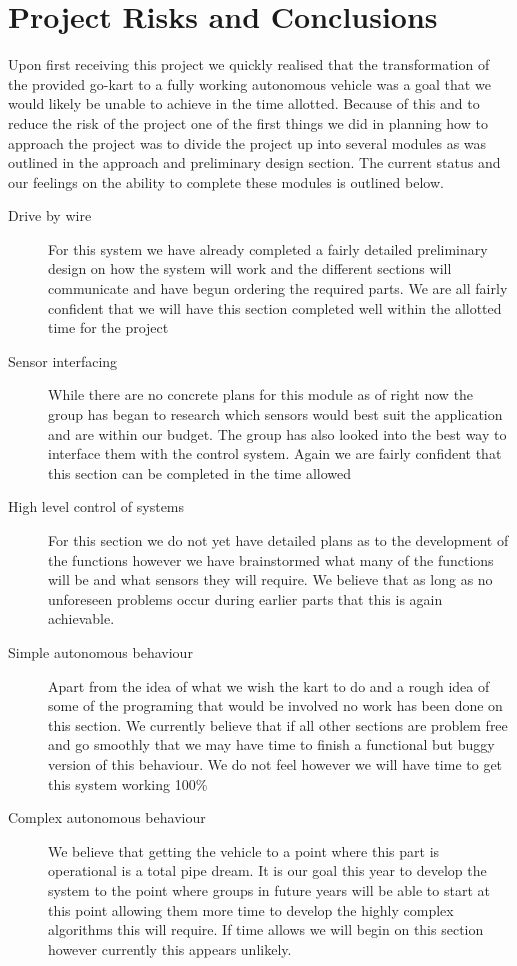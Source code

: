 \chapter{Project Risks and Conclusions}

Upon first receiving this project we quickly realised that the transformation of the provided go-kart to a fully working autonomous vehicle was a goal that we would likely be unable to achieve in the time allotted. Because of this and to reduce the risk of the project one of the first things we did in planning how to approach the project was to divide the project up into several modules as was outlined in the approach and preliminary design section. The current status and our feelings on the ability to complete these modules is outlined below.

\begin{description}
\item[Drive by wire] For this system we have already completed a fairly detailed preliminary design on how the system will work and the different sections will communicate and have begun ordering the required parts. We are all fairly confident that we will have this section completed well within the allotted time for the project

\item[Sensor interfacing] While there are no concrete plans for this module as of right now the group has began to research which sensors would best suit the application and are within our budget. The group has also looked into the best way to interface them with the control system. Again we are fairly confident that this section can be completed in the time allowed

\item[High level control of systems] For this section we do not yet have detailed plans as to the development of the functions however we have brainstormed what many of the functions will be and what sensors they will require. We believe that as long as no unforeseen problems occur during earlier parts that this is again achievable.

\item[Simple autonomous behaviour] Apart from the idea of what we wish the kart to do and a rough idea of some of the programing that would be involved no work has been done on this section. We currently believe that if all other sections are problem free and go smoothly that we may have time to finish a functional but buggy version of this behaviour. We do not feel however we will have time to get this system working 100\%

\item[Complex autonomous behaviour] We believe that getting the vehicle to a point where this part is operational is a total pipe dream. It is our goal this year to develop the system to the point where groups in future years will be able to start at this point allowing them more time to develop the highly complex algorithms this will require. If time allows we will begin on this section however currently this appears unlikely.
\end{description}
